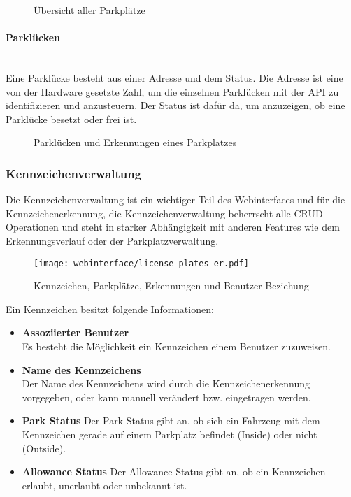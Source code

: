\begin{figure}[H]
  \centering
  \caption{Übersicht aller Parkplätze}
\end{figure}

\paragraph{Parklücken}\mbox{}\\
Eine Parklücke besteht aus einer Adresse und dem Status. Die Adresse ist eine
von der Hardware gesetzte Zahl, um die einzelnen Parklücken mit der API zu
identifizieren und anzusteuern. Der Status ist dafür da, um anzuzeigen, ob eine Parklücke besetzt
oder frei ist.

\begin{figure}[H]
  \centering
  \caption{Parklücken und Erkennungen eines Parkplatzes}
\end{figure}

\subsubsection{Kennzeichenverwaltung}
Die Kennzeichenverwaltung ist ein wichtiger Teil des Webinterfaces und für die
Kennzeichenerkennung, die Kennzeichenverwaltung beherrscht alle CRUD-Operationen
und steht in starker Abhängigkeit mit anderen Features wie dem Erkennungsverlauf oder der
Parkplatzverwaltung. 

\begin{figure}[H]
  \centering
  \texttt{[image: webinterface/license\_plates\_er.pdf]}
  \caption{Kennzeichen, Parkplätze, Erkennungen und Benutzer Beziehung}
\end{figure}

Ein Kennzeichen besitzt folgende Informationen:

\begin{itemize}
  \item \textbf{Assoziierter Benutzer}\\
  Es besteht die Möglichkeit ein Kennzeichen einem Benutzer zuzuweisen.
  \item \textbf{Name des Kennzeichens}\\
  Der Name des Kennzeichens wird durch die Kennzeichenerkennung vorgegeben, oder
  kann manuell verändert bzw. eingetragen werden.
  \item \textbf{Park Status}
  Der Park Status gibt an, ob sich ein Fahrzeug mit dem Kennzeichen gerade auf
  einem Parkplatz befindet (Inside) oder nicht (Outside).
  \item \textbf{Allowance Status}
  Der Allowance Status gibt an, ob ein Kennzeichen erlaubt, unerlaubt oder
  unbekannt ist.
\end{itemize}

